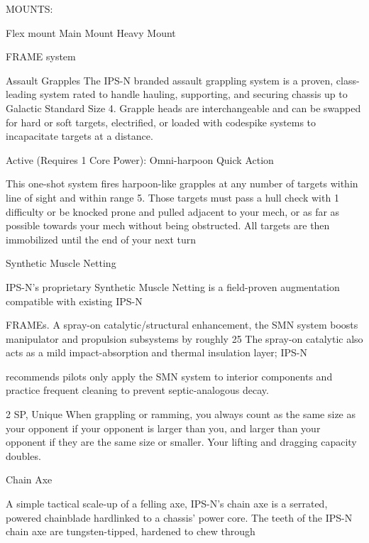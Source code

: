                                                      MOUNTS:

  Flex mount                          Main Mount                             Heavy Mount

                                                  FRAME system




                                                   Assault Grapples
   The IPS-N branded assault grappling system is a proven, class-leading system rated to handle hauling,
  supporting, and securing chassis up to Galactic Standard Size 4. Grapple heads are interchangeable
  and can be swapped for hard or soft targets, electrified, or loaded with codespike systems to
  incapacitate targets at a distance.


  Active (Requires 1 Core Power): Omni-harpoon
   Quick Action

  This one-shot system fires harpoon-like grapples at any number of targets within line of sight and within
   range 5. Those targets must pass a hull check with 1 difficulty or be knocked prone and pulled adjacent
  to your mech, or as far as possible towards your mech without being obstructed. All targets are then
   immobilized until the end of your next turn

Synthetic Muscle Netting

IPS-N’s proprietary Synthetic Muscle Netting is a field-proven augmentation compatible with existing IPS-N

FRAMEs. A spray-on catalytic/structural enhancement, the SMN system boosts manipulator and
propulsion subsystems by roughly 25%
The spray-on catalytic also acts as a mild impact-absorption and thermal insulation layer; IPS-N

recommends pilots only apply the SMN system to interior components and practice frequent cleaning to
prevent septic-analogous decay.

2 SP, Unique
When grappling or ramming, you always count as the same size as your opponent if your
opponent is larger than you, and larger than your opponent if they are the same size or smaller.
Your lifting and dragging capacity doubles.


Chain Axe

A simple tactical scale-up of a felling axe, IPS-N’s chain axe is a serrated, powered chainblade hardlinked
to a chassis’ power core. The teeth of the IPS-N chain axe are tungsten-tipped, hardened to chew through

